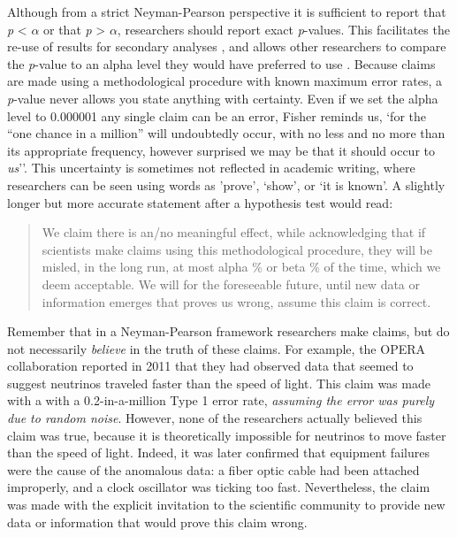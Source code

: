 \documentclass[
  oneside]{book}
\begin{document}
Although from a strict Neyman-Pearson perspective it is sufficient to report that \emph{p} \textless{} \(\alpha\) or that \emph{p} \textgreater{} \(\alpha\), researchers should report exact \emph{p}-values. This facilitates the re-use of results for secondary analyses \citep{appelbaum_journal_2018}, and allows other researchers to compare the \emph{p}-value to an alpha level they would have preferred to use \citep{lehmann_testing_2005}. Because claims are made using a methodological procedure with known maximum error rates, a \emph{p}-value never allows you state anything with certainty. Even if we set the alpha level to 0.000001 any single claim can be an error, Fisher \citeyearpar{fisher_design_1935} reminds us, `for the ``one chance in a million'' will undoubtedly occur, with no less and no more than its appropriate frequency, however surprised we may be that it should occur to \emph{us}''. This uncertainty is sometimes not reflected in academic writing, where researchers can be seen using words as 'prove', `show', or `it is known'. A slightly longer but more accurate statement after a hypothesis test would read:

\begin{quote}
We claim there is an/no meaningful effect, while acknowledging that if scientists make claims using this methodological procedure, they will be misled, in the long run, at most alpha \% or beta \% of the time, which we deem acceptable. We will for the foreseeable future, until new data or information emerges that proves us wrong, assume this claim is correct.
\end{quote}

Remember that in a Neyman-Pearson framework researchers make claims, but do not necessarily \emph{believe} in the truth of these claims. For example, the OPERA collaboration reported in 2011 that they had observed data that seemed to suggest neutrinos traveled faster than the speed of light. This claim was made with a with a 0.2-in-a-million Type 1 error rate, \emph{assuming the error was purely due to random noise}. However, none of the researchers actually believed this claim was true, because it is theoretically impossible for neutrinos to move faster than the speed of light. Indeed, it was later confirmed that equipment failures were the cause of the anomalous data: a fiber optic cable had been attached improperly, and a clock oscillator was ticking too fast. Nevertheless, the claim was made with the explicit invitation to the scientific community to provide new data or information that would prove this claim wrong.
\end{document}
